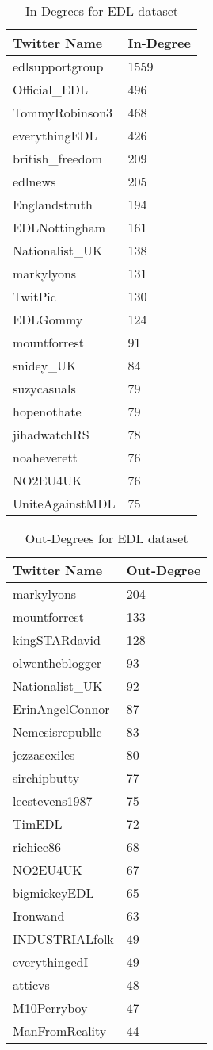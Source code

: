 \begin{table}[htbp]%
\centering
\begin{tabular}{|l|l|}
\hline
Twitter Name & In-Degree \\
\hline
edlsupportgroup & 1559 \\
Official\_EDL & 496 \\
TommyRobinson3 & 468 \\
everythingEDL & 426 \\
british\_freedom & 209 \\
edlnews & 205 \\
Englandstruth & 194 \\
EDLNottingham & 161 \\
Nationalist\_UK & 138 \\
markylyons & 131 \\
TwitPic & 130 \\
EDLGommy & 124 \\
mountforrest & 91 \\
snidey\_UK & 84 \\
suzycasuals & 79 \\
hopenothate & 79 \\
jihadwatchRS & 78 \\
noaheverett & 76 \\
NO2EU4UK & 76 \\
UniteAgainstMDL & 75 \\
\hline
\end{tabular}
\caption{In-Degrees for EDL dataset}
\label{tab:edlin}
\end{table}

\begin{table}[htbp]%
\centering
\begin{tabular}{|l|l|}
\hline
Twitter Name & Out-Degree \\
\hline
markylyons & 204 \\
mountforrest & 133 \\
kingSTARdavid & 128 \\
olwentheblogger & 93 \\
Nationalist\_UK & 92 \\
ErinAngelConnor & 87 \\
Nemesisrepubllc & 83 \\
jezzasexiles & 80 \\
sirchipbutty & 77 \\
leestevens1987 & 75 \\
TimEDL & 72 \\
richiec86 & 68 \\
NO2EU4UK & 67 \\
bigmickeyEDL & 65 \\
Ironwand & 63 \\
INDUSTRIALfolk & 49 \\
everythingedI & 49 \\
atticvs & 48 \\
M10Perryboy & 47 \\
ManFromReality & 44 \\
\hline
\end{tabular}
\caption{Out-Degrees for EDL dataset}
\label{tab:edlout}
\end{table}


